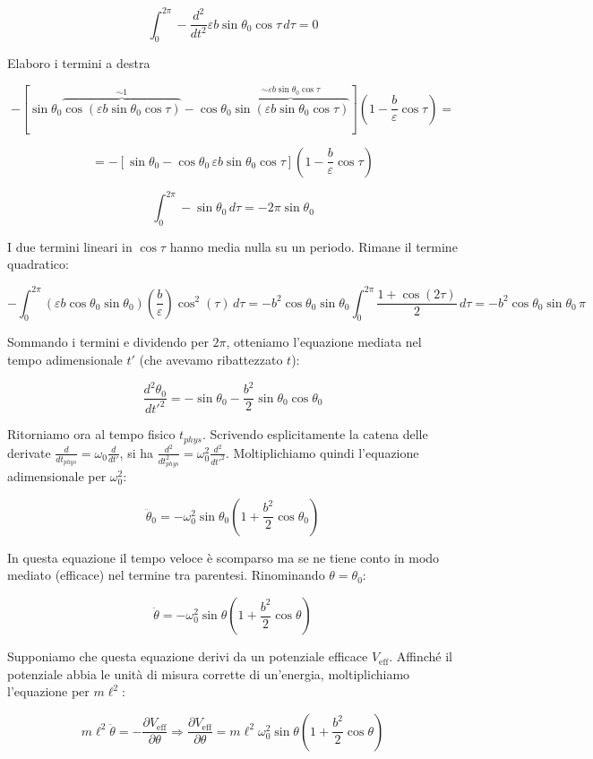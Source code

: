 \[
\int_0^{2\pi}
-
\frac{d^2}{dt^2}
\varepsilon b\sin\theta_0\cos\tau
\,d\tau
=
0
\]

Elaboro i termini a destra

\[
-
\left[
\sin\theta_0
\overbrace{
\cos(\varepsilon b\sin\theta_0\cos\tau)
}^{\sim 1}
-
\cos\theta_0
\overbrace{
\sin(\varepsilon b\sin\theta_0\cos\tau)
}^{\sim \varepsilon b\sin\theta_0\cos\tau}
\right]
\left(
1-\frac{b}{\varepsilon}
\cos\tau
\right)
=
\]

\[
=
-
\left[
\sin\theta_0
-
\cos\theta_0\,\varepsilon b\sin\theta_0\cos\tau
\right]
\left(
1-\frac{b}{\varepsilon}
\cos\tau
\right)
\]

\[
\int_0^{2\pi}
-\sin\theta_0\,d\tau
=
-2\pi\sin\theta_0
\]

I due termini lineari in $\cos\tau$ hanno media nulla su un periodo. Rimane il termine quadratico:

\[
-
\int_0^{2\pi}
\left(\varepsilon b\cos\theta_0\sin\theta_0\right)
\left(\frac{b}{\varepsilon}\right)
\cos^2(\tau)
\,d\tau
=
-
b^2
\cos\theta_0\sin\theta_0
\int_0^{2\pi}
\frac{1+\cos(2\tau)}{2}
\,d\tau
=
-
b^2
\cos\theta_0\sin\theta_0\,\pi
\]

Sommando i termini e dividendo per $2\pi$, otteniamo l'equazione mediata nel tempo adimensionale $t'$ (che avevamo ribattezzato $t$):

\[
\frac{d^2\theta_0}{dt'^2}
=
-\sin\theta_0
-
\frac{b^2}{2}\sin\theta_0\cos\theta_0
\]

Ritorniamo ora al tempo fisico $t_{phys}$. Scrivendo esplicitamente la catena delle derivate $\frac{d}{dt_{phys}} = \omega_0 \frac{d}{dt'}$, si ha $\frac{d^2}{dt_{phys}^2} = \omega_0^2 \frac{d^2}{dt'^2}$. Moltiplichiamo quindi l'equazione adimensionale per $\omega_0^2$:

\[
\ddot{\theta}_0
=
-\omega_0^2\sin\theta_0
\left(
1+
\frac{b^2}{2}\cos\theta_0
\right)
\]

In questa equazione il tempo veloce è scomparso ma se ne tiene conto in modo mediato (efficace) nel termine tra parentesi. Rinominando $\theta=\theta_0$:

\[
\ddot{\theta}
=
-\omega_0^2\sin\theta
\left(
1+\frac{b^2}{2}\cos\theta
\right)
\]

Supponiamo che questa equazione derivi da un potenziale efficace $V_{\text{eff}}$. Affinché il potenziale abbia le unità di misura corrette di un'energia, moltiplichiamo l'equazione per $m\ell^2$:

\[
m\ell^2\ddot{\theta}
=
-\frac{\partial V_{\text{eff}}}{\partial \theta}
\Rightarrow
\frac{\partial V_{\text{eff}}}{\partial \theta}
=
m\ell^2\omega_0^2\sin\theta
\left(
1+\frac{b^2}{2}\cos\theta
\right)
\]

